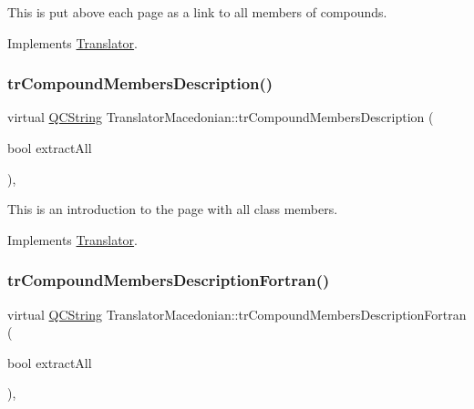 This is put above each page as a link to all members of compounds. 

Implements \mbox{\hyperlink{class_translator}{Translator}}.

\mbox{\label{class_translator_macedonian_aad62c409d1150dc25a22641e33ff5c64}} 
\subsubsection{\texorpdfstring{trCompoundMembersDescription()}{trCompoundMembersDescription()}}
{\footnotesize\ttfamily virtual \mbox{\hyperlink{class_q_c_string}{Q\+C\+String}} Translator\+Macedonian\+::tr\+Compound\+Members\+Description (\begin{DoxyParamCaption}\item[{bool}]{extract\+All }\end{DoxyParamCaption})\hspace{0.3cm}{\ttfamily [inline]}, {\ttfamily [virtual]}}

This is an introduction to the page with all class members. 

Implements \mbox{\hyperlink{class_translator}{Translator}}.

\mbox{\label{class_translator_macedonian_a7ea39ab9ec65c73c0af7fbbc113d3f03}} 
\subsubsection{\texorpdfstring{trCompoundMembersDescriptionFortran()}{trCompoundMembersDescriptionFortran()}}
{\footnotesize\ttfamily virtual \mbox{\hyperlink{class_q_c_string}{Q\+C\+String}} Translator\+Macedonian\+::tr\+Compound\+Members\+Description\+Fortran (\begin{DoxyParamCaption}\item[{bool}]{extract\+All }\end{DoxyParamCaption})\hspace{0.3cm}{\ttfamily [inline]}, {\ttfamily [virtual]}}

